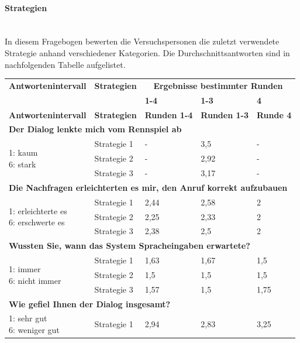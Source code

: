 \documentclass[12pt,a4paper]{scrartcl}
\begin{document}
\paragraph{Strategien}
~\\
In diesem Fragebogen bewerten die Versuchspersonen die zuletzt verwendete Strategie anhand verschiedener Kategorien. Die Durchschnittsantworten sind in nachfolgenden Tabelle aufgelistet. 
\newpage
\begin{longtable}{|p{4cm}|p{2cm}|p{2cm}|p{2cm}|p{2cm}|}
	\hline
		\textbf{Antwortenintervall}&\textbf{Strategien}&\multicolumn{3}{c|}{\textbf{Ergebnisse bestimmter Runden}}\\
	&&\textbf{1-4}&\textbf{1-3} &\textbf{4}\\
	\hline
	\endfirsthead
	\hline
	\textbf{Antwortenintervall}&\textbf{Strategien}&\textbf{Runden 1-4}&\textbf{Runden 1-3} &\textbf{Runde 4}\\
	\hline
	\endhead
		\multicolumn{5}{l}{\textbf{Der Dialog lenkte mich vom Rennspiel ab}}\\
		\hline
\multirow{3}{4cm}{1: kaum \newline 6: stark} & Strategie 1 & - & 3,5  & - \\
 - & Strategie 2 & - & 2,92 & -\\
 - & Strategie 3 & - & 3,17 & -\\
\hline
		\multicolumn{5}{l}{\textbf{Die Nachfragen erleichterten es mir, den Anruf korrekt aufzubauen}}\\
		\hline
\multirow{3}{4cm}{1: erleichterte es\newline  6: erschwerte es} & Strategie 1 & 2,44 & 2,58 & 2 \\
 & Strategie 2 & 2,25 & 2,33 & 2 \\
 & Strategie 3 & 2,38 & 2,5 & 2 \\
\hline
		\multicolumn{5}{l}{\textbf{Wussten Sie, wann das System Spracheingaben erwartete?}}\\
		\hline
\multirow{3}{4cm}{1: immer \newline  6: nicht immer} & Strategie 1 & 1,63 & 1,67 & 1,5 \\
 & Strategie 2 & 1,5 & 1,5 & 1,5 \\
 & Strategie 3 & 1,57 & 1,5 & 1,75 \\
\hline
		\multicolumn{5}{l}{\textbf{Wie gefiel Ihnen der Dialog insgesamt?}}\\
		\hline
\multirow{3}{4cm}{1: sehr gut \newline  6: weniger gut} & Strategie 1 & 2,94 & 2,83 & 3,25 \\

\end{longtable}
\end{document}
